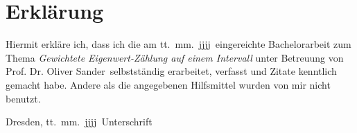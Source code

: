 \documentclass[a4paper,12pt]{report}
\newcommand{\betreuer}{Prof. Dr. Oliver Sander}
\newcommand{\thema}{Gewichtete Eigenwert-Zählung auf einem Intervall}
\newcommand{\datum}{tt.\ mm.\ jjjj} %
\theoremstyle{plain} %
\theoremstyle{definition} %
\theoremstyle{remark}
\begin{document}
      \printbibliography


\chapter*{Erkl\"{a}rung}
\thispagestyle{empty}
Hiermit erkl\"{a}re ich, dass ich die am \datum\ eingereichte Bachelorarbeit zum Thema
\emph{\thema} unter Betreuung von \betreuer\ selbstst\"{a}ndig erarbeitet,
verfasst und Zitate kenntlich gemacht habe. Andere als die angegebenen Hilfsmittel
wurden von mir nicht benutzt.

\bigskip \bigskip \bigskip \bigskip \bigskip

Dresden, \datum\ \hfill Unterschrift

\normalsize
\end{document}
